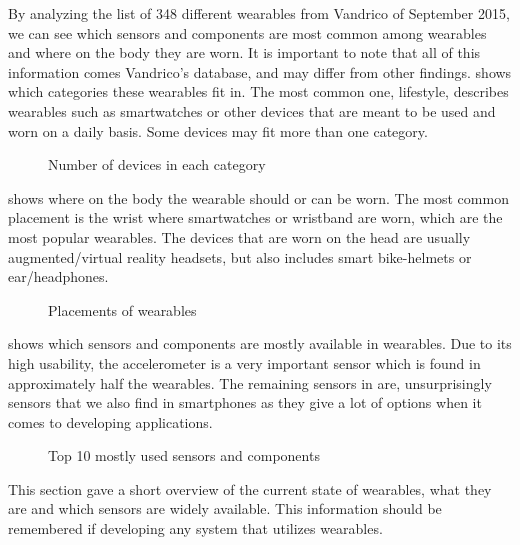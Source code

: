 By analyzing the list of 348 different wearables from Vandrico \cite{LISTOFWEARABLES} of September 2015, 
we can see which sensors and components are most common among wearables and where on the body they are worn. 
It is important to note that all of this information comes Vandrico's database, and may differ from other findings. 
 shows which categories these wearables fit in. The most common one, lifestyle, 
describes wearables such as smartwatches or other devices that are meant to be used and worn on a daily basis. 
Some devices may fit more than one category.

\begin{figure}[!htb]
    \centering
    
    \caption{Number of devices in each category}
    \label{fig:wearables-category}
\end{figure}

 shows where on the body the wearable should or can be worn. 
The most common placement is the wrist where smartwatches or wristband are worn, 
which are the most popular wearables. The devices that are worn on the head are usually augmented/virtual reality headsets, 
but also includes smart bike-helmets or ear/headphones.

\begin{figure}[!htb]
    \centering
    
    \caption{Placements of wearables}
    \label{fig:wearables-placement}
\end{figure}

 shows which sensors and components are mostly available in wearables. 
Due to its high usability, the accelerometer is a very important sensor which is found in approximately half the wearables. 
The remaining sensors in  are, unsurprisingly sensors that we also find in smartphones as they give a lot of options when it comes to developing applications. 
\begin{figure}[!htb]
    \centering
    
    \caption{Top 10 mostly used sensors and components}
    \label{fig:wearables-sensors}
\end{figure}

This section gave a short overview of the current state of wearables, what they are and which sensors are widely available. 
This information should be remembered if developing any system that utilizes wearables. 


